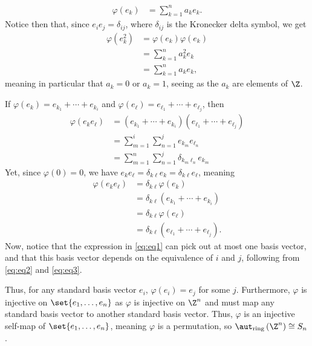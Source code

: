 \documentclass[10pt]{mypackage}
\begin{document}
\begin{solution}
\begin{enumerate}[(a)]
      \begin{align*}
        \varphi\left( e_k \right) &= \sum_{k=1}^{n}a_ke_k.
      \end{align*}
      Notice then that, since $e_ie_j = \delta_{ij}$, where $\delta_{ij}$ is the Kronecker delta symbol, we get
      \begin{align*}
        \varphi\left( e_k^2 \right) &= \varphi\left( e_k \right)\varphi\left( e_k \right)\\
                                    &= \sum_{k=1}^{n} a_k^2e_k\\
                                    &= \sum_{k=1}^{n}a_ke_k,
      \end{align*}
      meaning in particular that $a_k = 0$ or $a_k = 1$, seeing as the $a_k$ are elements of $\Z$.\newline

      If $\varphi\left( e_k \right) = e_{k_1} + \cdots + e_{k_i}$ and $\varphi\left( e_{\ell} \right) = e_{\ell_1} + \cdots + e_{\ell_j}$, then
      \begin{align*}
        \varphi\left( e_ke_\ell \right) &= \left( e_{k_1} + \cdots + e_{k_i} \right)\left( e_{\ell_1} + \cdots + e_{\ell_j} \right)\\
                                        &= \sum_{m=1}^{i}\sum_{n=1}^{j}e_{k_m}e_{\ell_n}\\
                                        &= \sum_{m=1}^{n}\sum_{n=1}^{j}\delta_{k_m\ell_n} e_{k_m}\label{eq:eq1}\tag{$\ast$}
      \end{align*}
      Yet, since $\varphi\left( 0 \right) = 0$, we have $e_ke_{\ell} = \delta_{k\ell} e_k = \delta_{k\ell}e_{\ell}$, meaning
      \begin{align*}
        \varphi\left( e_ke_{\ell} \right) &= \delta_{k\ell} \varphi\left( e_k \right)\\
                                          &= \delta_{k\ell} \left( e_{k_1} + \cdots + e_{k_i} \right)\label{eq:eq2}\tag{$\dag$}\\
                                          &= \delta_{k\ell} \varphi\left( e_{\ell} \right)\\
                                          &= \delta_{k\ell} \left( e_{\ell_1} + \cdots + e_{\ell_j} \right).\label{eq:eq3}\tag{$\ddag$}
      \end{align*}
      Now, notice that the expression in \eqref{eq:eq1} can pick out at most one basis vector, and that this basis vector depends on the equivalence of $i$ and $j$, following from \eqref{eq:eq2} and \eqref{eq:eq3}.\newline

      Thus, for any standard basis vector $e_i$, $\varphi\left( e_i \right) = e_j$ for some $j$. Furthermore, $\varphi$ is injective on $\set{e_1,\dots,e_n}$ as $\varphi$ is injective on $\Z^{n}$ and must map any standard basis vector to another standard basis vector. Thus, $\varphi$ is an injective self-map of $\set{e_1,\dots,e_n}$, meaning $\varphi$ is a permutation, so $\aut_{\text{ring}}\left( \Z^{n} \right) \cong S_n$.
  \end{enumerate}
\end{solution}
\end{document}
